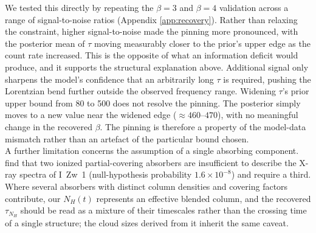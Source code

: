 \documentclass{aa}
\begin{document}
We tested this directly by repeating the $\beta = 3$ and $\beta = 4$ validation across a range of signal-to-noise ratios (Appendix \ref{app:recovery}). Rather than relaxing the constraint, higher signal-to-noise made the pinning more pronounced, with the posterior mean of $\tau$ moving measurably closer to the prior's upper edge as the count rate increased. This is the opposite of what an information deficit would produce, and it supports the structural explanation above. Additional signal only sharpens the model's confidence that an arbitrarily long $\tau$ is required, pushing the Lorentzian bend further outside the observed frequency range. Widening $\tau$'s prior upper bound from 80 to 500 does not resolve the pinning. The posterior simply moves to a new value near the widened edge ($\approx 460$--$470$), with no meaningful change in the recovered $\beta$. The pinning is therefore a property of the model-data mismatch rather than an artefact of the particular bound chosen. \\
A further limitation concerns the assumption of a single absorbing component. \citet{Huang2026} find that two ionized partial-covering absorbers are insufficient to describe the X-ray spectra of I~Zw~1 (null-hypothesis probability $1.6 \times 10^{-8}$) and require a third. Where several absorbers with distinct column densities and covering factors contribute, our $N_H(t)$ represents an effective blended column, and the recovered $\tau_{N_H}$ should be read as a mixture of their timescales rather than the crossing time of a single structure; the cloud sizes derived from it inherit the same caveat. \\
\end{document}
